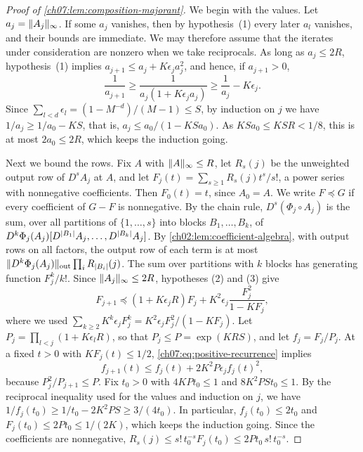 \begin{proof}[Proof of \cref{ch07:lem:composition-majorant}]
We begin with the values. Let $a_j=\lVert A_j\rVert_\infty$. If some $a_j$ vanishes, then by hypothesis~(1) every later $a_l$ vanishes, and their bounds are immediate. We may therefore assume that the iterates under consideration are nonzero when we take reciprocals. As long as $a_j\le2R$, hypothesis~(1) implies $a_{j+1}\le a_j+K\epsilon_ja_j^2$, and hence, if $a_{j+1}>0$,
\[
 \frac1{a_{j+1}}\ge\frac1{a_j(1+K\epsilon_ja_j)}\ge\frac1{a_j}-K\epsilon_j .
\]
Since $\sum_{l<d}\epsilon_l=(1-M^{-d})/(M-1)\le S$, by induction on $j$ we have $1/a_j\ge1/a_0-KS$, that is, $a_j\le a_0/(1-KSa_0)$. As $KSa_0\le KSR<1/8$, this is at most $2a_0\le2R$, which keeps the induction going.

Next we bound the rows. Fix $A$ with $\lVert A\rVert_\infty\le R$, let $R_s(j)$ be the unweighted output row of $D^sA_j$ at $A$, and let $F_j(t)=\sum_{s\ge1}R_s(j)t^s/s!$, a power series with nonnegative coefficients. Then $F_0(t)=t$, since $A_0=A$. We write $F\preceq G$ if every coefficient of $G-F$ is nonnegative. By the chain rule, $D^s(\Phi_j\circ A_j)$ is the sum, over all partitions of $\{1,\dots,s\}$ into blocks $B_1,\dots,B_k$, of $D^k\Phi_j(A_j)[D^{\lvert B_1\rvert}A_j,\dots,D^{\lvert B_k\rvert}A_j]$. By \cref{ch02:lem:coefficient-algebra}, with output rows on all factors, the output row of each term is at most $\lVert D^k\Phi_j(A_j)\rVert_{\mathrm{out}}\prod_iR_{\lvert B_i\rvert}(j)$. The sum over partitions with $k$ blocks has generating function $F_j^k/k!$. Since $\lVert A_j\rVert_\infty\le2R$, hypotheses (2) and (3) give
\begin{equation}\label{ch07:eq:positive-recurrence}
 F_{j+1}\preceq(1+K\epsilon_jR)F_j+K^2\epsilon_j\frac{F_j^2}{1-KF_j},
\end{equation}
where we used $\sum_{k\ge2}K^k\epsilon_jF_j^k=K^2\epsilon_jF_j^2/(1-KF_j)$. Let $P_j=\prod_{l<j}(1+K\epsilon_lR)$, so that $P_j\le P=\exp(KRS)$, and let $f_j=F_j/P_j$. At a fixed $t>0$ with $KF_j(t)\le1/2$, \eqref{ch07:eq:positive-recurrence} implies
\[
 f_{j+1}(t)\le f_j(t)+2K^2P\epsilon_jf_j(t)^2,
\]
because $P_j^2/P_{j+1}\le P$. Fix $t_0>0$ with $4KPt_0\le1$ and $8K^2PSt_0\le1$. By the reciprocal inequality used for the values and induction on $j$, we have $1/f_j(t_0)\ge1/t_0-2K^2PS\ge3/(4t_0)$. In particular, $f_j(t_0)\le2t_0$ and $F_j(t_0)\le2Pt_0\le1/(2K)$, which keeps the induction going. Since the coefficients are nonnegative, $R_s(j)\le s!\,t_0^{-s}F_j(t_0)\le2Pt_0\,s!\,t_0^{-s}$.


\end{proof}
